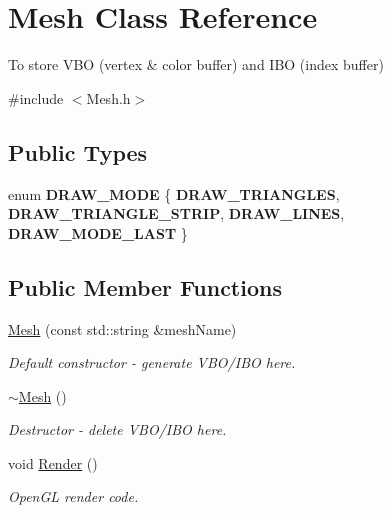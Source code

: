 \hypertarget{class_mesh}{\section{Mesh Class Reference}
\label{class_mesh}
}


To store V\+B\+O (vertex \& color buffer) and I\+B\+O (index buffer)  




{\ttfamily \#include $<$Mesh.\+h$>$}

\subsection*{Public Types}
\begin{DoxyCompactItemize}
\item 
\hypertarget{class_mesh_a3d73fcae9980b9a36297a8481cf1a307}{enum {\bfseries D\+R\+A\+W\+\_\+\+M\+O\+D\+E} \{ {\bfseries D\+R\+A\+W\+\_\+\+T\+R\+I\+A\+N\+G\+L\+E\+S}, 
{\bfseries D\+R\+A\+W\+\_\+\+T\+R\+I\+A\+N\+G\+L\+E\+\_\+\+S\+T\+R\+I\+P}, 
{\bfseries D\+R\+A\+W\+\_\+\+L\+I\+N\+E\+S}, 
{\bfseries D\+R\+A\+W\+\_\+\+M\+O\+D\+E\+\_\+\+L\+A\+S\+T}
 \}}\label{class_mesh_a3d73fcae9980b9a36297a8481cf1a307}

\end{DoxyCompactItemize}
\subsection*{Public Member Functions}
\begin{DoxyCompactItemize}
\item 
\hyperlink{class_mesh_a8618160123ac2c27985d7ae34ad58cae}{Mesh} (const std\+::string \&mesh\+Name)
\begin{DoxyCompactList}\small\item\em Default constructor -\/ generate V\+B\+O/\+I\+B\+O here. \end{DoxyCompactList}\item 
\hypertarget{class_mesh_a5efe4da1a4c0971cfb037bd70304c303}{\hyperlink{class_mesh_a5efe4da1a4c0971cfb037bd70304c303}{$\sim$\+Mesh} ()}\label{class_mesh_a5efe4da1a4c0971cfb037bd70304c303}

\begin{DoxyCompactList}\small\item\em Destructor -\/ delete V\+B\+O/\+I\+B\+O here. \end{DoxyCompactList}\item 
\hypertarget{class_mesh_a75e66bcd90c09492676a4cfe5b23c3af}{void \hyperlink{class_mesh_a75e66bcd90c09492676a4cfe5b23c3af}{Render} ()}\label{class_mesh_a75e66bcd90c09492676a4cfe5b23c3af}

\begin{DoxyCompactList}\small\item\em Open\+G\+L render code. \end{DoxyCompactList}\end{DoxyCompactItemize}
